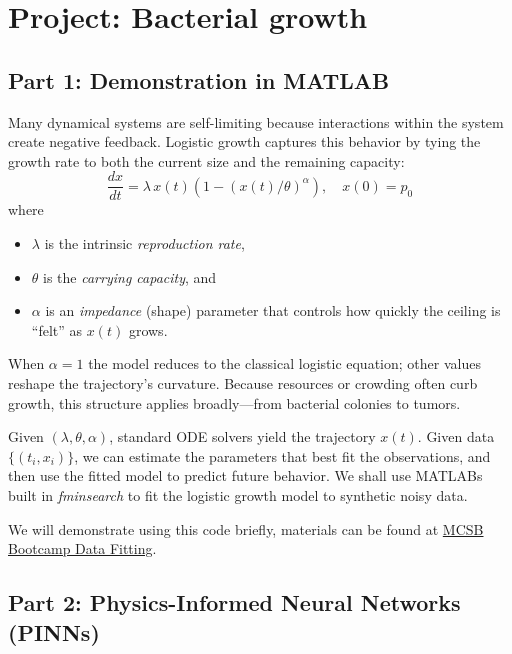 \documentclass{exam}
\begin{document}
\section*{Project: Bacterial growth}


\subsection*{Part 1: Demonstration in MATLAB}
Many dynamical systems are self-limiting because interactions within the system create negative feedback. Logistic growth captures this behavior by tying the growth rate to both the current size and the remaining capacity:
\begin{equation}
\frac{dx}{dt}
= \lambda\,x(t)\!\left(1-\left(x(t)/\theta\right)^{\alpha}\right),\quad x(0)=p_0
\end{equation}
where
\begin{itemize}
  \item $\lambda$ is the intrinsic \emph{reproduction rate},
  \item $\theta$ is the \emph{carrying capacity}, and
  \item $\alpha$ is an \emph{impedance} (shape) parameter that controls how quickly the ceiling is “felt” as $x(t)$ grows.
\end{itemize}
When $\alpha=1$ the model reduces to the classical logistic equation; other values reshape the trajectory’s curvature. Because resources or crowding often curb growth, this structure applies broadly—from bacterial colonies to tumors.

Given $(\lambda,\theta,\alpha)$, standard ODE solvers yield the trajectory $x(t)$. Given data $\{(t_i,x_i)\}$, we can estimate the parameters that best fit the observations, and then use the fitted model to predict future behavior. We shall use MATLABs built in \emph{fminsearch} to fit the logistic growth model to synthetic noisy data. 

\vspace{5mm}

We will demonstrate using this code briefly, materials can be found at \hyperlink{https://github.com/CalebHend/MCSB-Bootcamp-Data-Fitting/tree/main/fminsearch-MATLAB-Demo}{MCSB Bootcamp Data Fitting}.


\newpage

\subsection*{Part 2: Physics-Informed Neural Networks (PINNs)}
\end{document}
